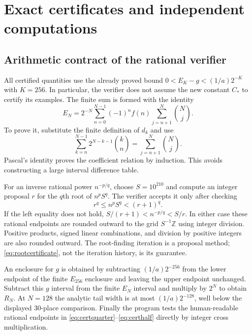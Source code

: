 \documentclass[11pt]{article}
\numberwithin{equation}{section}
\theoremstyle{definition}\newtheorem{definition}[theorem]{Definition}
\theoremstyle{remark}\newtheorem{remark}[theorem]{Remark}
\newcommand{\Cstar}{C_*}
\begin{document}
\section{Exact certificates and independent computations}
\label{sec:verification}
\subsection{Arithmetic contract of the rational verifier}
All certified quantities use the already proved bound
$0<E_K-g<(1/a)2^{-K}$ with $K=256$. In particular, the verifier does
not assume the new constant $\Cstar$ to certify its examples.
The finite sum is formed with the identity
\begin{equation}\label{eq:Eulerweights}
 E_N=2^{-N}\sum_{n=0}^{N-1}(-1)^nf(n)
                   \sum_{j=n+1}^N\binom Nj.
\end{equation}
To prove it, substitute the finite definition of $d_k$ and use
\[
 \sum_{k=n}^{N-1}2^{N-k-1}\binom kn
 =\sum_{j=n+1}^N\binom Nj.
\]
Pascal's identity proves the coefficient relation by induction.
This avoids constructing a large interval difference table.

For an inverse rational power $n^{-p/q}$, choose $S=10^{210}$ and
compute an integer proposal $r$ for the $q$th root of $n^pS^q$.
The verifier accepts it only after checking
\begin{equation}\label{eq:rootcertificate}
 r^q\le n^pS^q<(r+1)^q.
\end{equation}
If the left equality does not hold, $S/(r+1)<n^{-p/q}<S/r$.
In either case these rational endpoints are rounded outward to the
grid $S^{-1}\mathbb Z$ using integer division. Positive products,
signed linear combinations, and division by positive integers are
also rounded outward. The root-finding iteration is a proposal method;
\eqref{eq:rootcertificate}, not the iteration history, is its guarantee.

An enclosure for $g$ is obtained by subtracting $(1/a)2^{-256}$ from
the lower endpoint of the finite $E_{256}$ enclosure and leaving the
upper endpoint unchanged. Subtract this $g$ interval from the finite
$E_N$ interval and multiply by $2^N$ to obtain $R_N$. At $N=128$ the
analytic tail width is at most $(1/a)2^{-128}$, well below the displayed
30-place comparison. Finally the program tests the human-readable
rational endpoints in \eqref{eq:certquarter}--\eqref{eq:certhalf}
directly by integer cross multiplication.
\end{document}
